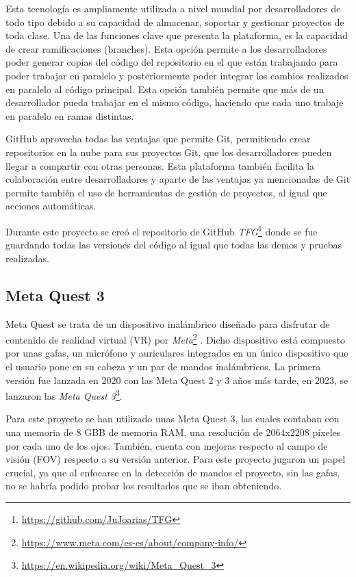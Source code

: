 \documentclass[a4paper, 12pt]{book}
\begin{document}
Esta tecnología es ampliamente utilizada a nivel mundial por desarrolladores de todo tipo debido a su capacidad de almacenar, soportar y gestionar proyectos de toda clase. Una de las funciones clave que presenta la plataforma, es la capacidad de crear ramificaciones (branches). Esta opción permite a los desarrolladores poder generar copias del código del repositorio en el que 
están trabajando para poder trabajar en paralelo y posteriormente poder integrar los cambios realizados en paralelo al código principal. Esta opción también permite que más de un desarrollador pueda trabajar en el mismo código, haciendo que cada uno trabaje en paralelo en ramas distintas. 

GitHub aprovecha todas las ventajas que permite Git, permitiendo crear repositorios en la nube para sus proyectos Git, que los desarrolladores pueden llegar a compartir con otras personas. Esta plataforma también facilita la colaboración entre desarrolladores y aparte de las ventajas ya mencionadas de Git permite también el uso de herramientas de gestión de proyectos, al igual que acciones automáticas. 

Durante este proyecto se creó el repositorio de GitHub \textit{TFG}\footnote{\url{https://github.com/JuJoarias/TFG}} donde se fue guardando todas las versiones del código al igual que todas las demos y pruebas realizadas.

\subsection{Meta Quest 3}
\label{subsec:metaquest}

Meta Quest se trata de un dispositivo inalámbrico diseñado para disfrutar de contenido de realidad virtual (VR) por \textit{Meta}\footnote{\url{https://www.meta.com/es-es/about/company-info/}} \cite{meta_company_info}. Dicho dispositivo está compuesto por unas gafas, un micrófono y auriculares integrados en un único dispositivo que el usuario pone en su cabeza y un par de mandos inalámbricos. 
La primera versión fue lanzada en 2020 con las Meta Quest 2 y 3 años más tarde, en 2023, se lanzaron las \textit{Meta Quest 3}\footnote{\url{https://en.wikipedia.org/wiki/Meta_Quest_3}}. 

Para este proyecto se han utilizado unas Meta Quest 3, las cuales contaban con una memoria de 8 GBB de memoria RAM, una resolución de 2064x2208 píxeles por cada uno de los ojos. También, cuenta con mejoras respecto al campo de visión (FOV) respecto a su versión anterior. Para este proyecto jugaron un papel crucial, ya que al enfocarse en la detección de mandos
el proyecto, sin las gafas, no se habría podido probar los resultados que se iban obteniendo.
\end{document}
